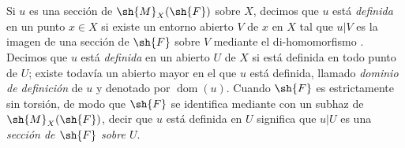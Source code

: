\begin{env}[20.1.7]
\label{IV.20.1.7}
Si $u$ es una sección de $\sh{M}_X(\sh{F})$ sobre $X$, decimos que $u$ está \emph{definida} en un punto $x\in X$ si existe un entorno abierto $V$ de $x$ en $X$ tal que $u|V$ es la imagen de una sección de $\sh{F}$ sobre $V$ mediante el di-homomorfismo .
Decimos que $u$ está \emph{definida} en un abierto $U$ de $X$ si está definida en todo punto de $U$; existe todavía un abierto mayor en el que $u$ está definida, llamado \emph{dominio de definición} de $u$ y denotado por $\operatorname{dom}(u)$.
Cuando $\sh{F}$ es estrictamente sin torsión, de modo que $\sh{F}$ se identifica mediante  con un subhaz de $\sh{M}_X(\sh{F})$, decir que $u$ está definida en $U$ significa que $u|U$ es una \emph{sección de $\sh{F}$ sobre $U$}.
\end{env}


